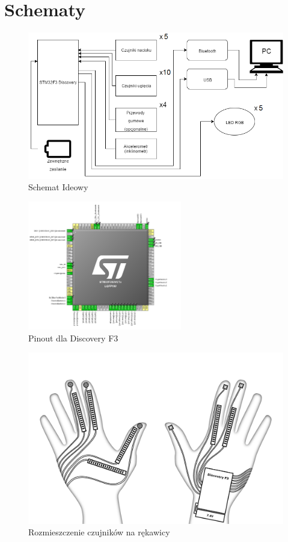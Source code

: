 \documentclass[12pt,a4paper]{article}
\begin{document}
\section{Schematy}
\begin{figure}[!htb]
\includegraphics[width=\textwidth]{./SchematIdeowy.png}
\caption{Schemat Ideowy}
\end{figure}
\begin{figure}[!htb]
\centering
\includegraphics[width=0.6\textwidth]{./pinout.png}
\caption{Pinout dla Discovery F3}
\end{figure}
\begin{figure}[!htb]
\centering
\includegraphics[width=\textwidth]{./rekawica.jpg}
\caption{Rozmieszczenie czujników na rękawicy}
\end{figure}
\end{document}
